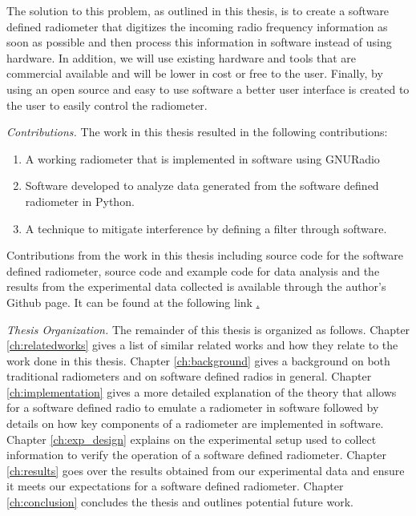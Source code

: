 The solution to this problem, as outlined in this thesis, is to create a software defined radiometer that digitizes the incoming radio frequency information as soon as possible and then process this information in software instead of using hardware.  In addition, we will use existing hardware and tools that are commercial available and will be lower in cost or free to the user.  Finally, by using an open source and easy to use software a better user interface is created to the user to easily control the radiometer. 

\emph{Contributions.}  The work in this thesis resulted in the following contributions:
\begin{enumerate}
\item A working radiometer that is implemented in software using GNURadio
\item Software developed to analyze data generated from the software defined radiometer in Python.
\item A technique to mitigate interference by defining a filter through software.
\end{enumerate}

Contributions from the work in this thesis including source code for the software defined radiometer, source code and example code for data analysis and the results from the experimental data collected is available through the author's Github page.  It can be found at the following link \href{http://www.github.com/matgyver/Radiometer-SDR-Thesis}.


\emph{Thesis Organization.}  The remainder of this thesis is organized as follows.  Chapter \ref{ch:relatedworks} gives a list of similar related works and how they relate to the work done in this thesis.  Chapter \ref{ch:background} gives a background on both traditional radiometers and on software defined radios in general.  Chapter \ref{ch:implementation} gives a more detailed explanation of the theory that allows for a software defined radio to emulate a radiometer in software followed by details on how key components of a radiometer are implemented in software.  Chapter \ref{ch:exp_design} explains on the experimental setup used to collect information to verify the operation of a software defined radiometer.  Chapter \ref{ch:results} goes over the results obtained from our experimental data and ensure it meets our expectations for a software defined radiometer.  Chapter \ref{ch:conclusion} concludes the thesis and outlines potential future work.

